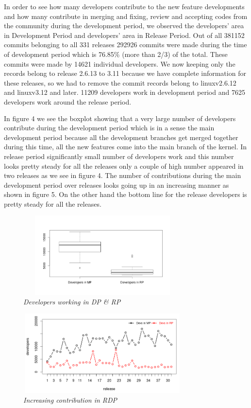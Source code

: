 \documentclass{acm_proc_article-sp}
\begin{document}
In order to see how many developers contribute to the new feature developments and how many contribute in merging and fixing, review and accepting codes from the community during the development period, we observed the developers' area in Development Period and developers' area in Release Period. Out of all 381152 commits belonging to all 331 releases 292926 commits were made during the time of development period which is 76.85\% (more than 2/3) of the total. These commits were made by 14621 individual developers. We now keeping only the records belong to release 2.6.13 to 3.11 because we have complete information for these releases, so we had to remove the commit records belong to linuxv2.6.12 and linuxv3.12 and later. 11209 developers work in development period and 7625 developers work around the release period.

In figure 4 we see the boxplot showing that a very large number of developers contribute during the development period which is in a sense the main development period because all the development branches get merged together during this time, all the new features come into the main branch of the kernel. In release period significantly small number of developers work and this number looks pretty steady for all the releases only a couple of high number appeared in two releases as we see in figure 4. The number of contributions during the main development period over releases looks going up in an increasing manner as shown in figure 5. On the other hand the bottom line for the release developers is pretty steady for all the releases.

\begin{figure}
\begin{center}
\includegraphics[height=1.7in,width=3.4in]{devsMPRPbox.png}
\caption{\small \sl Developers working in DP \& RP}
\end{center}
\end{figure}

\begin{figure}
\begin{center}
\includegraphics[height=1.7in,width=3.4in]{devsMPRP.png}
\caption{\small \sl Increasing contribution in RDP}
\end{center}
\end{figure}
\end{document}
